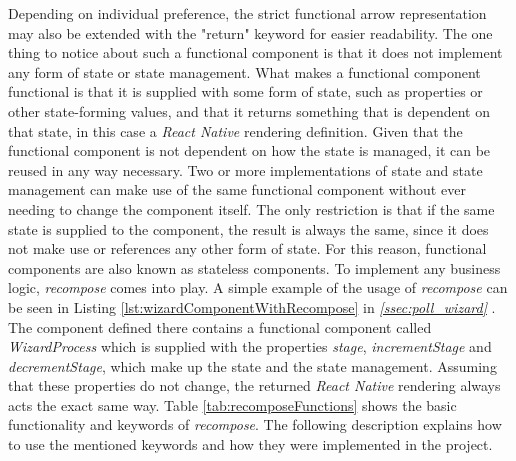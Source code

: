 Depending on individual preference, the strict functional arrow representation may also be extended with the "return" keyword for easier readability. The one thing to notice about such a functional component is that it does not implement any form of state or state management. What makes a functional component functional is that it is supplied with some form of state, such as properties or other state-forming values, and that it returns something that is dependent on that state, in this case a \textit{React Native} rendering definition. Given that the functional component is not dependent on how the state is managed, it can be reused in any way necessary. Two or more implementations of state and state management can make use of the same functional component without ever needing to change the component itself. The only restriction is that if the same state is supplied to the component, the result is always the same, since it does not make use or references any other form of state. For this reason, functional components are also known as stateless components.
\newline
To implement any business logic, \textit{recompose} comes into play. A simple example of the usage of \textit{recompose} can be seen in Listing \ref{lst:wizardComponentWithRecompose} in \textit{\ref{ssec:poll_wizard} }. The component defined there contains a functional component called \textit{WizardProcess} which is supplied with the properties \textit{stage}, \textit{incrementStage} and \textit{decrementStage}, which make up the state and the state management. Assuming that these properties do not change, the returned \textit{React Native} rendering always acts the exact same way.
\newline
Table \ref{tab:recomposeFunctions} shows the basic functionality and keywords of \textit{recompose}. The following description explains how to use the mentioned keywords and how they were implemented in the project.

